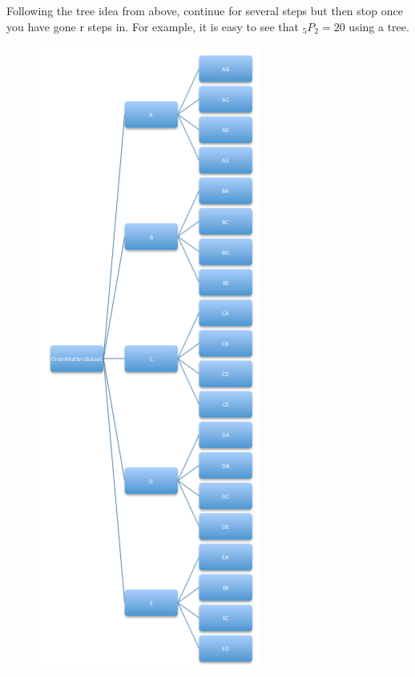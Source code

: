 \documentclass[10pt,]{book}
\numberwithin{equation}{section}
\begin{document}
Following the tree idea from above, continue for several steps but then stop once you have gone r steps in.  For example, it is easy to see that \(_5P_2 = 20\) using a tree. \begin{figure}\centering\includegraphics[width=1\linewidth]{images/PermutationSubTree.png}
\end{figure}%
\end{document}
